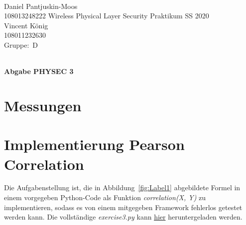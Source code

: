 \documentclass[12pt,a4paper]{article}
\newcommand{\student}{Daniel Pantjuskin-Moos\\ 108013248222 } %
\newcommand{\partner}{Vincent König\\ 108011232630} %
\newcommand{\group}{D} %
\newcommand{\hwheadtwo}{$ $
  \vspace{-2cm}
  
\noindent \student \qquad \qquad  Wireless Physical Layer Security Praktikum \hfill SS 2020 \\
\noindent \partner \\
\noindent Gruppe:~\group\\
$ $

  
\begin{center}    
{\Large \bf Abgabe PHYSEC 3}
\end{center}
}
\begin{document}
\hwheadtwo

\section{Messungen}

\section{Implementierung Pearson Correlation}


Die Aufgabenstellung ist, die in Abbildung~\ref{fig:Label1}
abgebildete Formel in einem vorgegeben Python-Code als 
Funktion \textit{correlation(X, Y)} zu implementieren, sodass 
es von einem mitgegeben Framework fehlerlos getestet werden 
kann. Die vollständige \textit{exercise3.py} kann  
\href{https://mega.nz/file/7gwx0BwR#dwkLdHX7AglZKYwp9poGQ-tEL20GtaqFy8LoT4TtV_g}
{hier} 
heruntergeladen werden.
\end{document}
